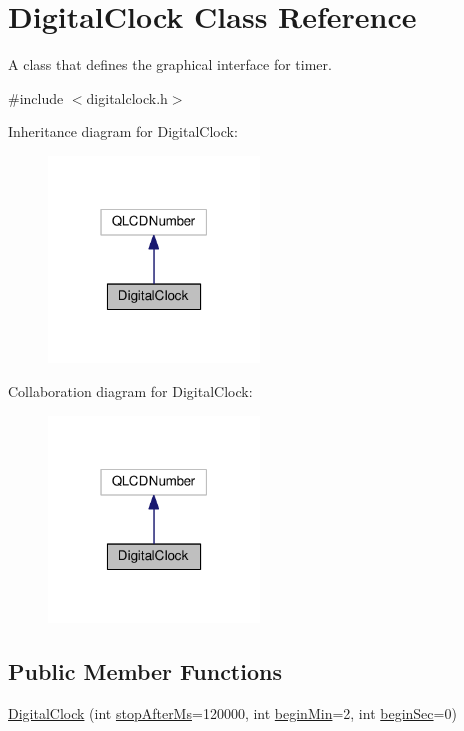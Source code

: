 \hypertarget{classDigitalClock}{}\section{Digital\+Clock Class Reference}
\label{classDigitalClock}


A class that defines the graphical interface for timer.  




{\ttfamily \#include $<$digitalclock.\+h$>$}



Inheritance diagram for Digital\+Clock\+:\nopagebreak
\begin{figure}[H]
\begin{center}
\leavevmode
\includegraphics[width=159pt]{classDigitalClock__inherit__graph}
\end{center}
\end{figure}


Collaboration diagram for Digital\+Clock\+:\nopagebreak
\begin{figure}[H]
\begin{center}
\leavevmode
\includegraphics[width=159pt]{classDigitalClock__coll__graph}
\end{center}
\end{figure}
\subsection*{Public Member Functions}
\begin{DoxyCompactItemize}
\item 
\hyperlink{classDigitalClock_af7c214200f518512b56638fb7d568000}{Digital\+Clock} (int \hyperlink{classDigitalClock_adfb81207db5e40a4ccf2b3812632325f}{stop\+After\+Ms}=120000, int \hyperlink{classDigitalClock_a0f09000c25752c09f48e05b96be37ea8}{begin\+Min}=2, int \hyperlink{classDigitalClock_aea23d1b4ccdcd8aa435aaab8d853af57}{begin\+Sec}=0)
\end{DoxyCompactItemize}
